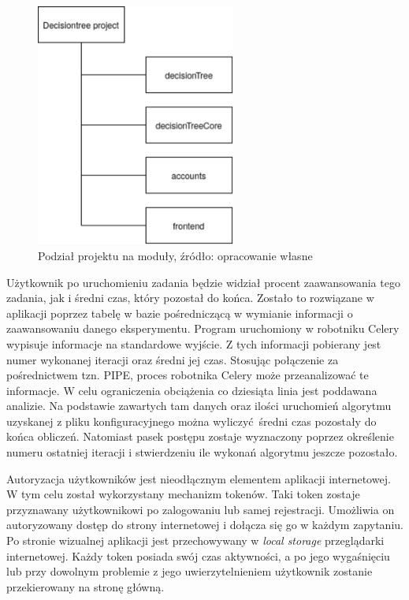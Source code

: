 \begin{figure}[htb]
	\centering
	\includegraphics[height=8cm]{grafika/packages.eps}
	\caption{Podział projektu na moduły, źródło: opracowanie własne}
	\label{rys4_packages}
\end{figure}
Użytkownik po uruchomieniu zadania będzie widział procent zaawansowania tego zadania, jak i średni czas, który pozostał do końca. Zostało to rozwiązane w aplikacji poprzez tabelę w bazie pośredniczącą w wymianie informacji o zaawansowaniu danego eksperymentu. Program uruchomiony w robotniku Celery wypisuje informacje na standardowe wyjście. Z tych informacji pobierany jest numer wykonanej iteracji oraz średni jej czas. Stosując połączenie za pośrednictwem tzn. PIPE, proces robotnika Celery może przeanalizować te informacje. W celu ograniczenia obciążenia co dziesiąta linia jest poddawana analizie. Na podstawie zawartych tam danych oraz ilości uruchomień algorytmu uzyskanej z pliku konfiguracyjnego można wyliczyć średni czas pozostały do końca obliczeń. Natomiast pasek postępu zostaje wyznaczony poprzez określenie numeru ostatniej iteracji i stwierdzeniu ile wykonań algorytmu jeszcze pozostało. 

Autoryzacja użytkowników jest nieodłącznym elementem aplikacji internetowej. W tym celu został wykorzystany mechanizm tokenów. Taki token zostaje przyznawany użytkownikowi po zalogowaniu lub samej rejestracji. Umożliwia on autoryzowany dostęp do strony internetowej i dołącza się go w każdym zapytaniu. Po stronie wizualnej aplikacji jest przechowywany w \textit{local storage} przeglądarki internetowej. Każdy token posiada swój czas aktywności, a po jego wygaśnięciu lub przy dowolnym problemie z jego uwierzytelnieniem użytkownik zostanie przekierowany na stronę główną. 

